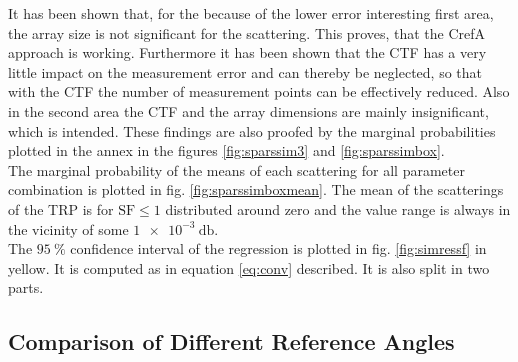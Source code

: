 It has been shown that, for the because of the lower error interesting first area, the array size is not significant for the scattering. This proves, that the \ac{CrefA} approach is working. Furthermore it has been shown that the \ac{CTF} has a very little impact on the measurement error and can thereby be neglected, so that with the \ac{CTF} the number of measurement points can be effectively reduced. Also in the second area the \ac{CTF} and the array dimensions are mainly insignificant, which is intended. These findings are also proofed by the marginal probabilities plotted in the annex in the figures \ref{fig:sparssim3} and \ref{fig:sparssimbox}.\\
The marginal probability of the means of each scattering for all parameter combination is plotted in fig. \ref{fig:sparssimboxmean}. The mean of the scatterings of the \ac{TRP} is for $\text{SF} \le 1$ distributed around zero and the value range is always in the vicinity of some $\SI{1e-3}{\decibel}$.\\
The $\SI{95}{\percent}$ confidence interval of the regression is plotted in fig. \ref{fig:simressf} in yellow. It is computed as in equation \ref{eq:conv} described. It is also split in two parts.

\subsection{Comparison of Different Reference Angles}

